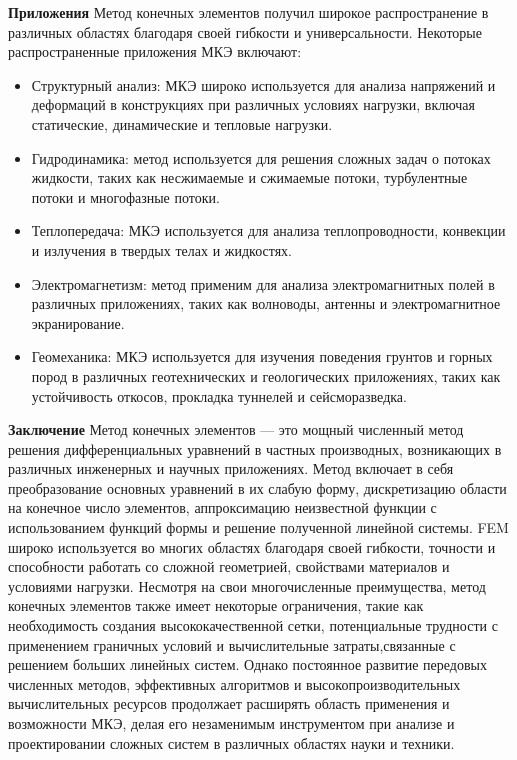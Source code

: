 \textbf{Приложения}
Метод конечных элементов получил широкое распространение в различных
областях благодаря своей гибкости и универсальности.
Некоторые распространенные приложения МКЭ включают:
\begin{itemize}
    \item Структурный анализ: МКЭ широко используется для анализа напряжений
    и деформаций в конструкциях при различных условиях нагрузки, включая
    статические, динамические и тепловые нагрузки.
    \item Гидродинамика: метод используется для решения сложных задач о
    потоках жидкости, таких как несжимаемые и сжимаемые потоки, турбулентные
    потоки и многофазные потоки.
    \item Теплопередача: МКЭ используется для анализа теплопроводности,
    конвекции и излучения в твердых телах и жидкостях.
    \item Электромагнетизм: метод применим для анализа электромагнитных
    полей в различных приложениях, таких как волноводы,
    антенны и электромагнитное экранирование.
    \item Геомеханика: МКЭ используется для изучения поведения грунтов
    и горных пород в различных геотехнических и геологических
    приложениях, таких как устойчивость откосов,
    прокладка туннелей и сейсморазведка.
\end{itemize}

\textbf{Заключение}
Метод конечных элементов — это мощный численный метод решения
дифференциальных уравнений в частных производных, возникающих
в различных инженерных и научных приложениях.
Метод включает в себя преобразование основных уравнений
в их слабую форму, дискретизацию области на конечное число
элементов, аппроксимацию неизвестной функции с использованием
функций формы и решение полученной линейной системы.
FEM широко используется во многих областях
благодаря своей гибкости, точности и способности
работать со сложной геометрией, свойствами
материалов и условиями нагрузки.
Несмотря на свои многочисленные преимущества, метод конечных
элементов также имеет некоторые ограничения,
такие как необходимость создания высококачественной сетки,
потенциальные трудности с применением граничных условий
и вычислительные затраты,связанные с решением больших линейных систем.
Однако постоянное развитие передовых численных методов,
эффективных алгоритмов и высокопроизводительных вычислительных
ресурсов продолжает расширять область применения
и возможности МКЭ, делая его незаменимым инструментом при
анализе и проектировании сложных систем
в различных областях науки и техники.

